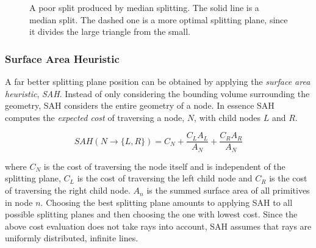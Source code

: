 \begin{figure}
  \centering

  \vspace{3mm}
  \parbox{5cm}{\caption[A poor split produced by median splitting.]{A
      poor split produced by median splitting. The solid line is a
      median split. The dashed one is a more optimal splitting plane,
      since it divides the large triangle from the
      small.}\label{fig:crapMedian}}
\end{figure}

\subsubsection{Surface Area Heuristic}


A far better splitting plane position can be obtained by applying the
\textit{surface area heuristic}, \textit{SAH}. Instead of only
considering the bounding volume surrounding the geometry, SAH
considers the entire geometry of a node. In essence SAH computes the
\textit{expected cost} of traversing a node, $N$, with child nodes $L$
and $R$.

\begin{displaymath}
  SAH(N \rightarrow \{L, R\}) = C_N + \frac{C_L A_L}{A_N} +
  \frac{C_R A_R}{A_N}
\end{displaymath}

where $C_N$ is the cost of traversing the node itself and is
independent of the splitting plane, $C_L$ is the cost of traversing
the left child node and $C_R$ is the cost of traversing the right
child node. $A_n$ is the summed surface area of all primitives in node
$n$. Choosing the best splitting plane amounts to applying SAH to all
possible splitting planes and then choosing the one with lowest
cost. Since the above cost evaluation does not take rays into account,
SAH assumes that rays are uniformly distributed, infinite lines.

